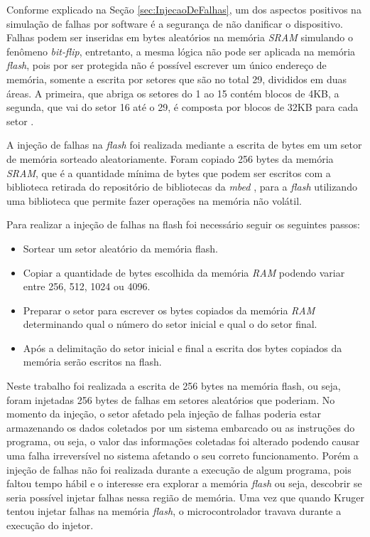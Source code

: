 Conforme explicado na Seção \ref{sec:InjecaoDeFalhas}, um dos aspectos positivos na simulação de falhas por software é a segurança de não danificar o dispositivo. Falhas podem ser inseridas em bytes aleatórios na memória \textit{SRAM} simulando o fenômeno \textit{bit-flip}, entretanto, a mesma lógica não pode ser aplicada na memória \textit{flash}, pois por ser protegida não é possível escrever um único endereço de memória, somente a escrita por setores que são no total 29, divididos em duas áreas. A primeira, que abriga os setores do 1 ao 15 contém blocos de 4KB, a segunda, que vai do setor 16 até o 29, é composta por blocos de 32KB para cada setor \cite{manualLpc176x:2016}.

A injeção de falhas na \textit{flash} foi realizada mediante a escrita de bytes em um setor de memória sorteado aleatoriamente. Foram copiado 256 bytes da memória \textit{SRAM}, que é a quantidade mínima de bytes que podem ser escritos com a biblioteca retirada do repositório de bibliotecas da \textit{mbed} \cite{escritaNaFlash:2016}, para a \textit{flash} utilizando uma biblioteca que permite fazer operações na memória não volátil. 

Para realizar a injeção de falhas na flash foi necessário seguir os seguintes passos:

\begin{itemize}
	\item Sortear um setor aleatório da memória flash.
	
	\item Copiar a quantidade de bytes escolhida da memória \textit{RAM} podendo variar entre 256, 512, 1024 ou 4096.
	
	\item Preparar o setor para escrever os bytes copiados da memória \textit{RAM} determinando qual o número do setor inicial e qual o do setor final.
	
	\item Após a delimitação do setor inicial e final a escrita dos bytes copiados da memória serão escritos na flash.
	
\end{itemize}

Neste trabalho foi realizada a escrita de 256 bytes na memória flash, ou seja, foram injetadas 256 bytes de falhas em setores aleatórios que poderiam. 
No momento da injeção, o setor afetado pela injeção de falhas poderia estar armazenando os dados coletados por um sistema embarcado ou as instruções do programa, ou seja, o valor das informações coletadas foi alterado podendo causar uma falha irreversível no sistema afetando o seu correto funcionamento. Porém a injeção de falhas não foi realizada durante a execução de algum programa, pois faltou tempo hábil e o interesse era explorar a memória \textit{flash} ou seja, descobrir se seria possível injetar falhas nessa região de memória. Uma vez que quando Kruger \cite{Kruger:2014} tentou injetar falhas na memória \textit{flash}, o microcontrolador travava durante a execução do injetor.


